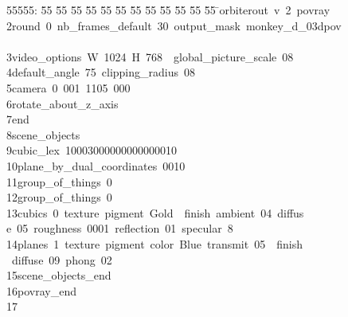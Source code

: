 %
%
\begin{tabbing}
55555: \= 55 \= 55 \= 55 \= 55 \= 55 \= 55 \= 55 \= 55 \= 55 \= 55 \= 55 \= 55 \= \>orbiterout\ v\ 2\ povray\ \\[0pt]
2\>\>round\ 0\ nb\_frames\_default\ 30\ output\_mask\ monkey\_d\_03dpov\ \\[0pt]
\>\\[0pt]
3\>\>video\_options\ W\ 1024\ H\ 768\ \ global\_picture\_scale\ 08\ \\[0pt]
4\>\>default\_angle\ 75\ clipping\_radius\ 08\ \\[0pt]
5\>\>camera\ 0\ 001\ 1105\ 000\ \ \\[0pt]
6\>\>rotate\_about\_z\_axis\ \\[0pt]
7\>\>end\ \\[0pt]
8\>\>scene\_objects\ \\[0pt]
9\>\>\>cubic\_lex\ 10003000000000000010\ \\[0pt]
10\>\>\>plane\_by\_dual\_coordinates\ 0010\ \\[0pt]
11\>\>\>group\_of\_things\ 0\ \\[0pt]
12\>\>\>group\_of\_things\ 0\ \\[0pt]
13\>\>\>cubics\ 0\ texture\ pigment\ Gold\ \ finish\ ambient\ 04\ diffus\\[0pt]
\>e\ 05\ roughness\ 0001\ reflection\ 01\ specular\ 8\ \ \\[0pt]
14\>\>\>planes\ 1\ texture\ pigment\ color\ Blue\ transmit\ 05\ \ finish\ \\[0pt]
\>\ diffuse\ 09\ phong\ 02\ \\[0pt]
15\>\>scene\_objects\_end\ \\[0pt]
16\>\>povray\_end\\[0pt]
17\>\end{tabbing}
